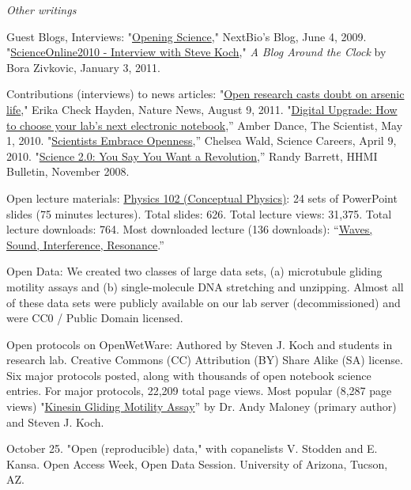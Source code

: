 \documentclass[11pt]{article}
\begin{document}

\bigskip 
\noindent\emph{Other writings \vspace{0.05in}}



\ind Guest Blogs, Interviews: "\href{http://goo.gl/5jvJY}{Opening Science}," NextBio's Blog, June 4, 2009. "\href{http://goo.gl/qvAuU}{ScienceOnline2010 - Interview with Steve Koch}," \emph{A Blog Around the Clock} by Bora Zivkovic, January 3, 2011.

\ind Contributions (interviews) to news articles: "\href{http://goo.gl/N8INQ}{Open research casts doubt on arsenic life}," Erika Check Hayden, Nature News, August 9, 2011. "\href{http://goo.gl/bQOom}{Digital Upgrade: How to choose your lab’s next electronic notebook},” Amber Dance, The Scientist, May 1, 2010. "\href{http://goo.gl/QEtg7}{Scientists Embrace Openness},” Chelsea Wald, Science Careers, April 9, 2010. "\href{http://goo.gl/Dx9WU}{Science 2.0: You Say You Want a Revolution},” Randy Barrett, HHMI Bulletin, November 2008.   

\ind Open lecture materials: \href{http://goo.gl/2L7kC}{Physics 102 (Conceptual Physics)}: 24 sets of PowerPoint slides (75 minutes lectures).  Total slides: 626. Total lecture views: 31,375. Total lecture downloads: 764. Most downloaded lecture (136 downloads): “\href{http://goo.gl/FCsfM}{Waves, Sound, Interference, Resonance}.” 

\ind Open Data: We created two classes of large data sets, (a) microtubule gliding motility assays and (b) single-molecule DNA stretching and unzipping.  Almost all of these data sets were publicly available on our lab server (decommissioned) and were CC0 / Public Domain licensed. 

\ind Open protocols on OpenWetWare: Authored by Steven J. Koch and students in research lab. Creative Commons (CC) Attribution (BY) Share Alike (SA) license. Six major protocols posted, along with thousands of open notebook science entries.  For major protocols, 22,209 total page views.  Most popular (8,287 page views) "\href{http://goo.gl/nGmJb}{Kinesin Gliding Motility Assay}” by Dr. Andy Maloney (primary author) and Steven J. Koch.  


\medskip

 October 25. "Open (reproducible) data," with copanelists V. Stodden and E. Kansa. Open Access Week, Open Data Session.  University of Arizona, Tucson, AZ.
\end{document}
